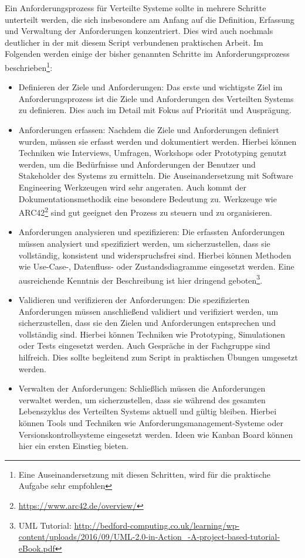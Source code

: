 \documentclass[../vs-script-first-v01.tex]{subfiles}
\begin{document}
Ein Anforderungsprozess für Verteilte Systeme sollte in mehrere Schritte unterteilt werden, die sich insbesondere am Anfang auf die Definition, Erfassung und Verwaltung der Anforderungen konzentriert. Dies wird auch nochmals deutlicher in der mit diesem Script verbundenen praktischen Arbeit. Im Folgenden werden einige der bisher genannten Schritte im Anforderungsprozess beschrieben\footnote{Eine Auseinandersetzung mit diesen Schritten, wird für die praktische Aufgabe sehr empfohlen}:
\begin{itemize}   
\item Definieren der Ziele und Anforderungen: Das erste und wichtigste Ziel im Anforderungsprozess ist die Ziele und Anforderungen des Verteilten Systems zu definieren. Dies auch im Detail mit Fokus auf Priorität und  Ausprägung.

\item Anforderungen erfassen: Nachdem die Ziele und Anforderungen definiert wurden, müssen sie erfasst werden und dokumentiert werden. Hierbei können Techniken wie Interviews, Umfragen, Workshops oder Prototyping genutzt werden, um die Bedürfnisse und Anforderungen der Benutzer und Stakeholder des Systems zu ermitteln. Die Auseinandersetzung mit Software Engineering Werkzeugen wird sehr angeraten. Auch kommt der Dokumentationsmethodik eine besondere Bedeutung zu. Werkzeuge wie ARC42\footnote{\url{https://www.arc42.de/overview/}} sind gut geeignet den Prozess zu steuern und zu organisieren. 

\item Anforderungen analysieren und spezifizieren: Die erfassten Anforderungen müssen analysiert und spezifiziert werden, um sicherzustellen, dass sie vollständig, konsistent und widerspruchsfrei sind. Hierbei können Methoden wie Use-Case-, Datenfluss- oder Zustandsdiagramme eingesetzt werden. Eine ausreichende Kenntnis der Beschreibung ist hier dringend geboten\footnote{UML Tutorial: \url{ http://bedford-computing.co.uk/learning/wp-content/uploads/2016/09/UML-2.0-in-Action_-A-project-based-tutorial-eBook.pdf}}. 

\item Validieren und verifizieren der Anforderungen: Die spezifizierten Anforderungen müssen anschließend validiert und verifiziert werden, um sicherzustellen, dass sie den Zielen und Anforderungen entsprechen und vollständig sind. Hierbei können Techniken wie Prototyping, Simulationen oder Tests eingesetzt werden. Auch Gespräche in der Fachgruppe sind hilfreich. Dies sollte begleitend zum Script in praktischen Übungen umgesetzt werden.

\item Verwalten der Anforderungen: Schließlich müssen die Anforderungen verwaltet werden, um sicherzustellen, dass sie während des gesamten Lebenszyklus des Verteilten Systems aktuell und gültig bleiben. Hierbei können Tools und Techniken wie Anforderungsmanagement-Systeme oder Versionskontrollsysteme eingesetzt werden. Ideen wie Kanban Board können hier ein ersten Einstieg bieten.
\end{itemize}   
\end{document}

